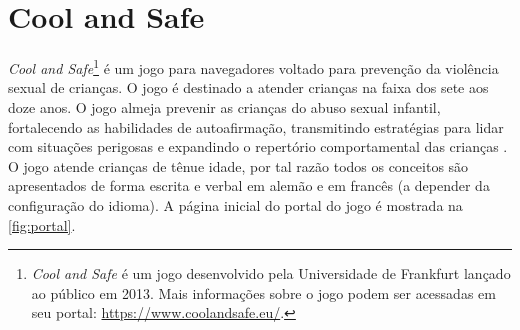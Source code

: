 











\section{Cool and Safe}\label{sssec:CeS}

\textit{Cool and Safe}\footnote{\textit{Cool and Safe} é um jogo desenvolvido pela Universidade de Frankfurt lançado ao público em 2013. Mais informações sobre o jogo podem ser acessadas em seu portal: \url{https://www.coolandsafe.eu/}.} é um jogo para navegadores voltado para prevenção da violência sexual de crianças. O jogo é destinado a atender crianças na faixa dos sete aos doze anos. O jogo almeja prevenir as crianças do abuso sexual infantil, fortalecendo as habilidades de autoafirmação, transmitindo estratégias para lidar com situações perigosas e expandindo o repertório comportamental das crianças \cite{pajalakasvatustieteiden}. O jogo atende crianças de tênue idade, por tal razão todos os conceitos são apresentados de forma escrita e verbal em alemão e em francês (a depender da configuração do idioma). A página inicial do portal do jogo é mostrada na \autoref{fig:portal}.

